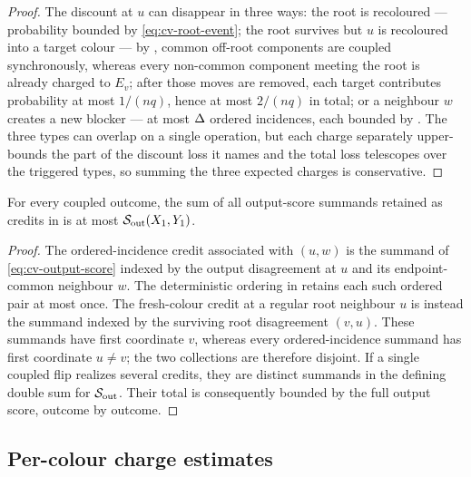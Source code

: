 \begin{proof}
The discount at $u$ can disappear in three ways: the root is recoloured ---
probability bounded by \eqref{eq:cv-root-event}; the root survives but $u$
is recoloured into a target colour --- by
, common off-root components are coupled synchronously,
whereas every non-common component meeting the root is already charged to
$E_v$; after those moves are removed, each target contributes probability
at most $1/(nq)$, hence at most $2/(nq)$ in total; or a neighbour $w$ creates a new
blocker --- at most $\Delta$ ordered incidences, each bounded by
. The three types can overlap on a single
operation, but each charge separately upper-bounds the part of the discount
loss it names and the total loss telescopes over the triggered types, so
summing the three expected charges is conservative.
\end{proof}

\begin{lemma}\label{lem:cv-credit-disjoint}
For every coupled outcome, the sum of all output-score summands retained as
credits in  is at most
\(\mathcal S_{\rm out}(X_1,Y_1)\).
\end{lemma}

\begin{proof}
The ordered-incidence credit associated with \((u,w)\) is the summand of
\eqref{eq:cv-output-score} indexed by the output disagreement at \(u\) and
its endpoint-common neighbour \(w\).  The deterministic ordering in
 retains each such ordered pair at most once.
The fresh-colour credit at a regular root neighbour \(u\) is instead the
summand indexed by the surviving root disagreement \((v,u)\).  These
summands have first coordinate \(v\), whereas every ordered-incidence
summand has first coordinate \(u\ne v\); the two collections are therefore
disjoint.  If a single coupled flip realizes several credits, they are
distinct summands in the defining double sum for
\(\mathcal S_{\rm out}\).  Their total is consequently bounded by the full
output score, outcome by outcome.
\end{proof}

\subsection{Per-colour charge estimates}

